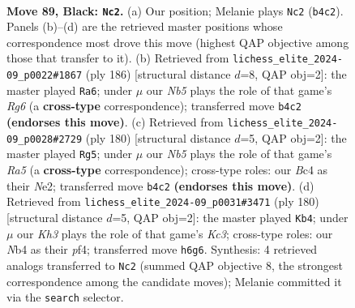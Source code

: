 \documentclass[11pt]{article}
\begin{document}
\clearpage

\begin{figure}[p]\centering
\begin{subfigure}{0.46\textwidth}\centering
\resizebox{\linewidth}{!}{%
\newchessgame
\chessboard[
  setfen={8/8/5B1k/8/1nb4K/8/5P2/8 b - - 24 89},
  showmover=false,
  pgfstyle=straightmove, color=movearrow, markmove={b4-c2}
]}
\caption{}
\end{subfigure}\hfill
\begin{subfigure}{0.46\textwidth}\centering
\resizebox{\linewidth}{!}{%
\newchessgame
\chessboard[
  setfen={8/8/6R1/b7/8/3K4/8/4k3 w - - 14 94},
  showmover=false,
  pgfstyle=straightmove, color=movearrow, markmove={g6-a6}
]}
\caption{}
\end{subfigure}
\\[4pt]
\begin{subfigure}{0.46\textwidth}\centering
\resizebox{\linewidth}{!}{%
\newchessgame
\chessboard[
  setfen={8/8/3k4/R7/4K1p1/8/4N2b/8 w - - 0 91},
  showmover=false,
  pgfstyle=straightmove, color=movearrow, markmove={a5-g5}
]}
\caption{}
\end{subfigure}\hfill
\begin{subfigure}{0.46\textwidth}\centering
\resizebox{\linewidth}{!}{%
\newchessgame
\chessboard[
  setfen={8/8/pB6/8/4bp2/2K5/6k1/8 w - - 4 91},
  showmover=false,
  pgfstyle=straightmove, color=movearrow, markmove={c3-b4}
]}
\caption{}
\end{subfigure}
\caption{\textbf{Move 89, Black: \texttt{Nc2}.} (a) Our position; Melanie plays \texttt{Nc2} (\texttt{b4c2}). Panels (b)--(d) are the retrieved master positions whose correspondence most drove this move (highest QAP objective among those that transfer to it). (b) Retrieved from \texttt{lichess\_elite\_2024-09\_p0022\#1867} (ply 186) [structural distance $d$=8, QAP obj=2]: the master played \texttt{Ra6}; under $\mu$ our \emph{Nb5} plays the role of that game's \emph{Rg6} (a \textbf{cross-type} correspondence); transferred move \texttt{b4c2} \textbf{(endorses this move)}. (c) Retrieved from \texttt{lichess\_elite\_2024-09\_p0028\#2729} (ply 180) [structural distance $d$=5, QAP obj=2]: the master played \texttt{Rg5}; under $\mu$ our \emph{Nb5} plays the role of that game's \emph{Ra5} (a \textbf{cross-type} correspondence); cross-type roles: our \emph{B}c4 as their \emph{N}e2; transferred move \texttt{b4c2} \textbf{(endorses this move)}. (d) Retrieved from \texttt{lichess\_elite\_2024-09\_p0031\#3471} (ply 180) [structural distance $d$=5, QAP obj=2]: the master played \texttt{Kb4}; under $\mu$ our \emph{Kh3} plays the role of that game's \emph{Kc3}; cross-type roles: our \emph{N}b4 as their \emph{p}f4; transferred move \texttt{h6g6}. Synthesis: 4 retrieved analogs transferred to \texttt{Nc2} (summed QAP objective 8, the strongest correspondence among the candidate moves); Melanie committed it via the \texttt{search} selector.}
\label{fig:thought-m177}
\end{figure}
\end{document}

